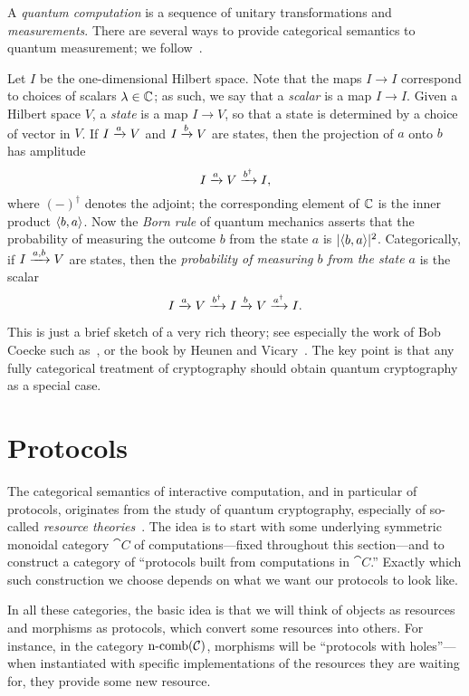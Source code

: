 A \emph{quantum computation} is a sequence of unitary transformations and
\emph{measurements}. There are several ways to provide categorical semantics to
quantum measurement; we follow~\cite{heunen-vicary-2014}.

Let $I$ be the one-dimensional Hilbert space. Note that the maps $I\to I$
correspond to choices of scalars $\lambda\in\mathbb{C}$; as such, we say that a
\emph{scalar} is a map $I\to I$. Given a Hilbert space $V$, a \emph{state} is a
map $I\to V$, so that a state is determined by a choice of vector in $V$. If
$I\xrightarrow{a} V$ and $I\xrightarrow{b} V$ are states, then the projection of $a$ onto $b$
has amplitude \[
  I\xrightarrow{a}V\xrightarrow{b^\dag} I,
\]where $(-)^\dag$ denotes the adjoint; the corresponding element of $\mathbb{C}$ is
the inner product $\langle b,a\rangle$. Now the \emph{Born rule} of quantum mechanics
asserts that the probability of measuring the outcome $b$ from the state $a$ is
$|\langle b, a\rangle|^2$. Categorically, if $I\xrightarrow{a,b} V$ are states, then the
\emph{probability of measuring $b$ from the state $a$} is the scalar \[
    I\xrightarrow{a}V\xrightarrow{b^\dag} I\xrightarrow{b} V\xrightarrow{a^\dag} I.
  \]

This is just a brief sketch of a very rich theory; see especially the work of
Bob Coecke such
as~\cite{abramsky-coecke-2004,coecke-perdrix-2012,coecke-kissinger-2017}, or the
book by Heunen and Vicary~\cite{heunen-vicary-2014}. The key point is that any
fully categorical treatment of cryptography should obtain quantum cryptography as
a special case.

\section{Protocols}
\label{sec:protocols}

The categorical semantics of interactive computation, and in particular of
protocols, originates from the study of quantum cryptography, especially of
so-called \emph{resource theories}~\cite{coecke-2016}. The idea is to start with
some underlying symmetric monoidal category $\cat{C}$ of computations---fixed throughout this
section---and to construct a category of ``protocols built from computations in
$\cat{C}$.'' Exactly which such construction we choose depends on what we want
our protocols to look like.

In all these categories, the basic idea is that we will think of objects as
resources and morphisms as protocols, which convert some resources into others.
For instance, in the category $\operatorname*{n-comb}({\mathcal{C}})$, morphisms will be ``protocols with
holes''---when instantiated with specific implementations of the resources they
are waiting for, they provide some new resource.


